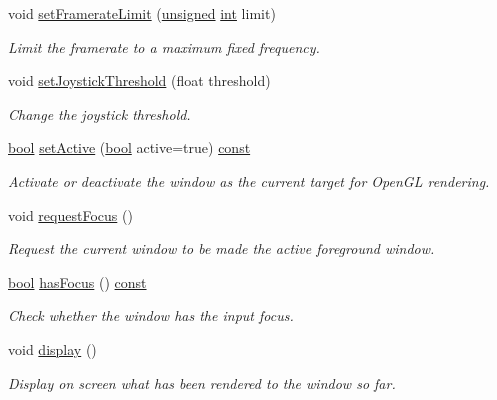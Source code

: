 \begin{DoxyCompactItemize}
void \hyperlink{classsf_1_1_window_af4322d315baf93405bf0d5087ad5e784}{set\-Framerate\-Limit} (\hyperlink{curses_8priv_8h_aca40206900cfc164654362fa8d4ad1e6}{unsigned} \hyperlink{term__entry_8h_ad65b480f8c8270356b45a9890f6499ae}{int} limit)
\begin{DoxyCompactList}\small\item\em Limit the framerate to a maximum fixed frequency. \end{DoxyCompactList}\item 
void \hyperlink{classsf_1_1_window_aa45b8f54e29a6f59f1fc7ee66b2fab68}{set\-Joystick\-Threshold} (float threshold)
\begin{DoxyCompactList}\small\item\em Change the joystick threshold. \end{DoxyCompactList}\item 
\hyperlink{term__entry_8h_a002004ba5d663f149f6c38064926abac}{bool} \hyperlink{classsf_1_1_window_a17ccf8ece0ce0bf2f1e6698bcfa29731}{set\-Active} (\hyperlink{term__entry_8h_a002004ba5d663f149f6c38064926abac}{bool} active=true) \hyperlink{term__entry_8h_a57bd63ce7f9a353488880e3de6692d5a}{const} 
\begin{DoxyCompactList}\small\item\em Activate or deactivate the window as the current target for Open\-G\-L rendering. \end{DoxyCompactList}\item 
void \hyperlink{classsf_1_1_window_a58cf7fa1775e8e7542032e3ecfa83b49}{request\-Focus} ()
\begin{DoxyCompactList}\small\item\em Request the current window to be made the active foreground window. \end{DoxyCompactList}\item 
\hyperlink{term__entry_8h_a002004ba5d663f149f6c38064926abac}{bool} \hyperlink{classsf_1_1_window_ac4dce670f07c5039a732ba0903ce3a77}{has\-Focus} () \hyperlink{term__entry_8h_a57bd63ce7f9a353488880e3de6692d5a}{const} 
\begin{DoxyCompactList}\small\item\em Check whether the window has the input focus. \end{DoxyCompactList}\item 
void \hyperlink{classsf_1_1_window_adabf839cb103ac96cfc82f781638772a}{display} ()
\begin{DoxyCompactList}\small\item\em Display on screen what has been rendered to the window so far. \end{DoxyCompactList}\item 

\end{DoxyCompactItemize}
